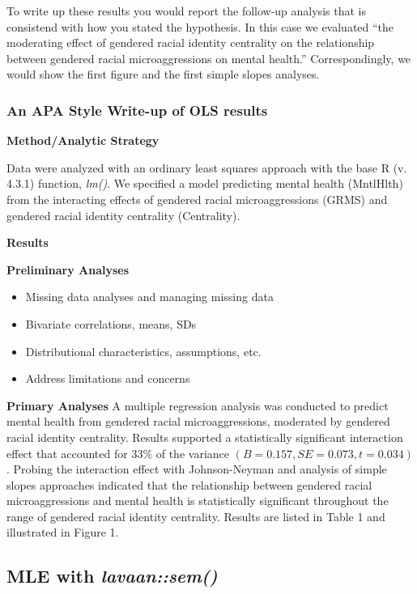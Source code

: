 \documentclass[
  11pt,
]{book}
\providecommand{\tightlist}{%
  \setlength{\itemsep}{0pt}\setlength{\parskip}{0pt}}
\begin{document}
To write up these results you would report the follow-up analysis that is consistend with how you stated the hypothesis. In this case we evaluated ``the moderating effect of gendered racial identity centrality on the relationship between gendered racial microaggressions on mental health.'' Correspondingly, we would show the first figure and the first simple slopes analyses.

\hypertarget{an-apa-style-write-up-of-ols-results}{%
\subsubsection{An APA Style Write-up of OLS results}\label{an-apa-style-write-up-of-ols-results}}

\textbf{Method/Analytic Strategy}

Data were analyzed with an ordinary least squares approach with the base R (v. 4.3.1) function, \emph{lm()}. We specified a model predicting mental health (MntlHlth) from the interacting effects of gendered racial microaggressions (GRMS) and gendered racial identity centrality (Centrality).

\textbf{Results}

\textbf{Preliminary Analyses}

\begin{itemize}
\tightlist
\item
  Missing data analyses and managing missing data
\item
  Bivariate correlations, means, SDs
\item
  Distributional characteristics, assumptions, etc.
\item
  Address limitations and concerns
\end{itemize}

\textbf{Primary Analyses} A multiple regression analysis was conducted to predict mental health from gendered racial microaggressions, moderated by gendered racial identity centrality. Results supported a statistically significant interaction effect that accounted for 33\% of the variance \((B = 0.157, SE = 0.073, t =0.034)\). Probing the interaction effect with Johnson-Neyman and analysis of simple slopes approaches indicated that the relationship between gendered racial microaggressions and mental health is statistically significant throughout the range of gendered racial identity centrality. Results are listed in Table 1 and illustrated in Figure 1.

\hypertarget{mle-with-lavaansem}{%
\subsection{\texorpdfstring{MLE with \emph{lavaan::sem()}}{MLE with lavaan::sem()}}\label{mle-with-lavaansem}}
\end{document}
